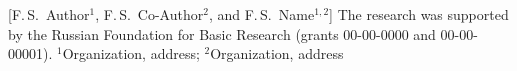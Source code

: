 \documentclass[12pt, twoside]{article}
\begin{document}
    [F.\,S.~Author$^1$, F.\,S.~Co-Author$^2$, and F.\,S.~Name$^{1, 2}$] %
\thanksEng
    {The research was
    	 supported by the Russian Foundation for Basic Research (grants 00-00-0000 and 00-00-00001).
    }
\organizationEng
    {$^1$Organization, address; $^2$Organization, address}
\abstractEng
     {
		

	
	
}
\end{document}
